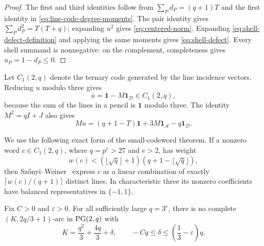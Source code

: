 \begin{proof}
The first and third identities follow from
\(\sum_Pd_P=(q+1)T\) and the first identity in
\eqref{eq:line-code-degree-moments}.  The pair identity gives
\(\sum_Pd_P^2=T(T+q)\); expanding \(u^2\) gives
\eqref{eq:centered-norm}.  Expanding
\eqref{eq:shell-defect-definition} and applying the same moments gives
\eqref{eq:shell-defect}.  Every shell summand is nonnegative: on the
complement, completeness gives \(u_P=1-d_P\le0\).
\end{proof}

Let \(C_1(2,q)\) denote the ternary code generated by the line incidence
vectors.  Reducing \(u\) modulo three gives
\begin{equation}\label{eq:residue-word}
 \bar u=\mathbf1-M\mathbf1_{\mathcal D}\in C_1(2,q),
\end{equation}
because the sum of the lines in a pencil is \(\mathbf1\) modulo three.
The identity \(M^2=qI+J\) also gives
\begin{equation}\label{eq:incidence-of-centered-word}
 Mu=(q+1-T)\mathbf1+3M\mathbf1_{\mathcal A}-q\mathbf1_{\mathcal D}.
\end{equation}

We use the following exact form of the small-codeword theorem.  If a nonzero
word \(c\in C_1(2,q)\), where \(q=p^e>27\) and \(e>2\), has weight
\[
 w(c)<(\lfloor\sqrt q\rfloor+1)
       (q+1-\lfloor\sqrt q\rfloor),
\]
then Sz\H{o}nyi--Weiner~\cite[Theorem~4.3]{SWmodp} express \(c\) as a linear
combination of exactly \(\lceil w(c)/(q+1)\rceil\) distinct lines.  In
characteristic three its nonzero coefficients have balanced representatives
in \(\{-1,1\}\).

\begin{theorem}\label{thm:line-code-gap}
Fix \(C>0\) and \(\varepsilon>0\).  For all sufficiently large
\(q=3^e\), there is no complete \((K,2q/3+1)\)-arc in \(\mathrm{PG}(2,q)\) with
\begin{equation}\label{eq:line-code-gap}
 K=\frac{q^2}{3}+\frac{4q}{3}+\delta,\qquad
 -Cq\le\delta\le\left(\frac13-\varepsilon\right)q.
\end{equation}
\end{theorem}

